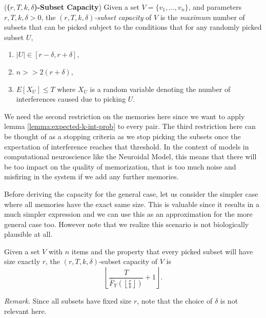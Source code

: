     \begin{definition} (\textbf{(\textit{$r,T,k,\delta$})-Subset Capacity}) Given a set $V = \{v_1,...,v_n\}$, and parameters $r, T, k, \delta > 0$, the \textit{$(r,T,k,\delta)$-subset capacity} of $V$ is the \textit{maximum} number of subsets that can be picked subject to the conditions that for any randomly picked subset $U$,
        \begin{enumerate}
            \item $|U| \in [r-\delta,r+\delta]$,
            \item $n >> 2(r+\delta)$,
            \item \label{equ:cap-bound-expected}$E[X_U] \le T$ where $X_U$ is a random variable denoting the number of interferences caused due to picking $U$. 
        \end{enumerate}
    \end{definition}

    We need the second restriction on the memories here since we want to apply lemma \ref{lemma:expected-k-int-prob} to every pair. The third restriction here can be thought of as a stopping criteria as we stop picking the subsets once the expectation of interference reaches that threshold. In the context of models in computational neuroscience like the Neuroidal Model, this means that there will be too impact on the quality of memorization, that is too much noise and misfiring in the system if we add any further memories.
    
    Before deriving the capacity for the general case, let us consider the simpler case where all memories have the exact same size. This is valuable since it results in a much simpler expression and we can use this as an approximation for the more general case too. However note that we realize this scenario is not biologically plausible at all. 

    \begin{theorem}
        \label{thm:exact-r}
        Given a set $V$ with $n$ items and the property that every picked subset will have size exactly $r$, the $(r,T,k,\delta)$-subset capacity of $V$ is 
        \begin{equation*}
            \left\lfloor \frac{T}{\bar{F}_Y\left(\left\lfloor \frac{r}{k} \right\rfloor\right)} + 1 \right\rfloor.
        \end{equation*}
    \end{theorem}

    \textit{Remark.} Since all subsets have fixed size $r$, note that the choice of $\delta$ is not relevant here.


